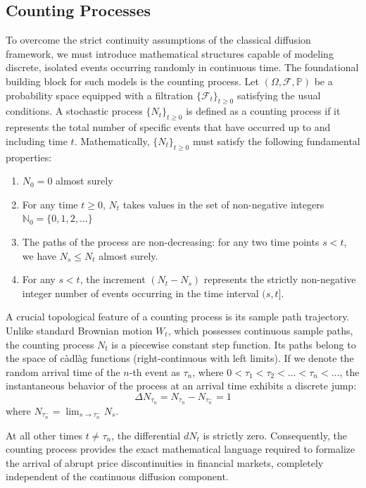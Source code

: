 \subsection{Counting Processes}
To overcome the strict continuity assumptions of the classical diffusion framework, we must introduce mathematical structures capable of modeling discrete, isolated events occurring randomly in continuous time. The foundational building block for such models is the counting process.
Let $(\Omega, \mathcal{F}, \mathbb{P})$ be a probability space equipped with a filtration $\{\mathcal{F}_t\}_{t \ge 0}$ satisfying the usual conditions. A stochastic process $\{N_t\}_{t \ge 0}$ is defined as a counting process if it represents the total number of specific events that have occurred up to and including time $t$.
Mathematically, $\{N_t\}_{t \ge 0}$ must satisfy the following fundamental properties:
\begin{enumerate}
    \item $N_0 = 0$ almost surely
    \item For any time $t \ge 0$, $N_t$ takes values in the set of non-negative integers $\mathbb{N}_0 = \{0, 1, 2, \dots\}$
    \item The paths of the process are non-decreasing: for any two time points $s < t$, we have $N_s \le N_t$ almost surely.
    \item For any $s < t$, the increment $(N_t - N_s)$ represents the strictly non-negative integer number of events occurring in the time interval $(s, t]$.
\end{enumerate}
A crucial topological feature of a counting process is its sample path trajectory. Unlike standard Brownian motion $W_t$, which possesses continuous sample paths, the counting process $N_t$ is a piecewise constant step function. Its paths belong to the space of càdlàg functions (right-continuous with left limits).
If we denote the random arrival time of the $n$-th event as $\tau_n$, where $0 < \tau_1 < \tau_2 < \dots < \tau_n < \dots$, the instantaneous behavior of the process at an arrival time exhibits a discrete jump:
$$\Delta N_{\tau_n} = N_{\tau_n} - N_{\tau_n^-} = 1$$
where $N_{\tau_n^-} = \lim_{s \to \tau_n^-} N_s$. 

At all other times $t \neq \tau_n$, the differential $dN_t$ is strictly zero. Consequently, the counting process provides the exact mathematical language required to formalize the arrival of abrupt price discontinuities in financial markets, completely independent of the continuous diffusion component.

